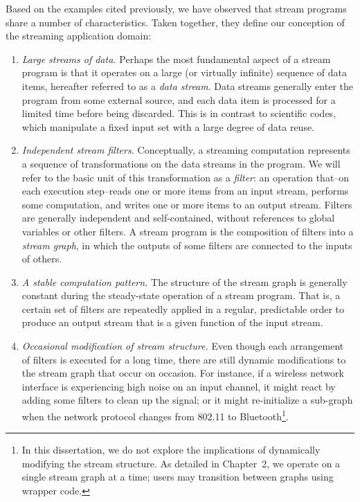 Based on the examples cited previously, we have observed that stream
programs share a number of characteristics.  Taken together, they
define our conception of the streaming application domain:

\begin{enumerate}

\item {\it Large streams of data.}  Perhaps the most fundamental
  aspect of a stream program is that it operates on a large (or
  virtually infinite) sequence of data items, hereafter referred to as
  a {\it data stream}.  Data streams generally enter the program from
  some external source, and each data item is processed for a limited
  time before being discarded.  This is in contrast to scientific
  codes, which manipulate a fixed input set with a large degree of
  data reuse.

\item {\it Independent stream filters.}  Conceptually, a streaming
  computation represents a sequence of transformations on the data
  streams in the program.  We will refer to the basic unit of this
  transformation as a {\it filter}: an operation that--on each
  execution step--reads one or more items from an input stream,
  performs some computation, and writes one or more items to an output
  stream.  Filters are generally independent and self-contained,
  without references to global variables or other filters.  A stream
  program is the composition of filters into a {\it stream graph}, in
  which the outputs of some filters are connected to the inputs of
  others.

\item {\it A stable computation pattern.}  The structure of the stream
  graph is generally constant during the steady-state operation of a
  stream program.  That is, a certain set of filters are repeatedly
  applied in a regular, predictable order to produce an output stream
  that is a given function of the input stream.

\item {\it Occasional modification of stream structure.}  Even though
  each arrangement of filters is executed for a long time, there are
  still dynamic modifications to the stream graph that occur on
  occasion.  For instance, if a wireless network interface is
  experiencing high noise on an input channel, it might react by
  adding some filters to clean up the signal; or it might
  re-initialize a sub-graph when the network protocol changes from
  802.11 to Bluetooth\footnote{In this dissertation, we do not explore
    the implications of dynamically modifying the stream structure.
    As detailed in Chapter~2, we operate on a single stream graph at a
    time; users may transition between graphs using wrapper code.}.


\end{enumerate}
